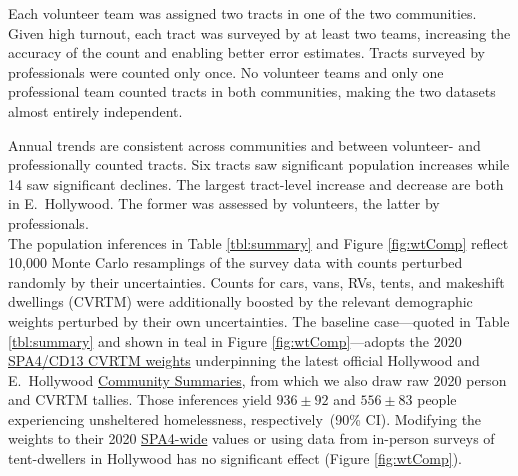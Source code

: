 \documentclass[11pt]{article}
\def\resp{respectively}
\begin{document}
Each volunteer team was assigned two tracts in one of the two communities. Given high turnout, each tract was 
surveyed by at least two teams, increasing the accuracy of the count and enabling better error estimates. Tracts 
surveyed by professionals were counted only once. No volunteer teams and only one professional team counted 
tracts in both communities, making the two datasets almost entirely independent.

Annual trends are consistent across communities and between volunteer- and professionally counted tracts.
Six tracts saw significant population increases while 14 saw significant declines. The largest tract-level
increase and decrease are both in E.~Hollywood. The former was assessed by volunteers, the latter by 
professionals.\\

 The population inferences in Table \ref{tbl:summary} and 
Figure \ref{fig:wtComp} reflect 10,000 Monte Carlo resamplings of the survey data with 
counts perturbed randomly by their uncertainties. Counts for cars, vans, RVs, tents, and 
makeshift dwellings (CVRTM) were additionally boosted by the relevant demographic weights 
perturbed by their own uncertainties. The baseline case---quoted in Table \ref{tbl:summary} and 
shown in teal in Figure \ref{fig:wtComp}---adopts the 2020 
\href{https://www.lahsa.org/documents?id=4635-usc-2018-2020-multipliers-and-estimates-overview}
{SPA4/CD13 CVRTM weights} underpinning the latest official Hollywood and E.~Hollywood 
\href{https://www.lahsa.org/documents?id=4686-2020-greater-los-angeles-city-community-homelessness-report-service-planning-area-4.pdf}
{Community Summaries}, from which we also draw raw 2020 person and CVRTM tallies. Those inferences yield 
$936\pm92$ and $556\pm83$ people experiencing unsheltered homelessness, \resp\ (90\% CI). Modifying the weights
to their 2020 \href{https://www.lahsa.org/documents?id=4693-2020-greater-los-angeles-homeless-count-cvrtm-conversion-factors}
{SPA4-wide} values or using data from in-person surveys of tent-dwellers in Hollywood has no
significant effect (Figure \ref{fig:wtComp}).
\end{document}
